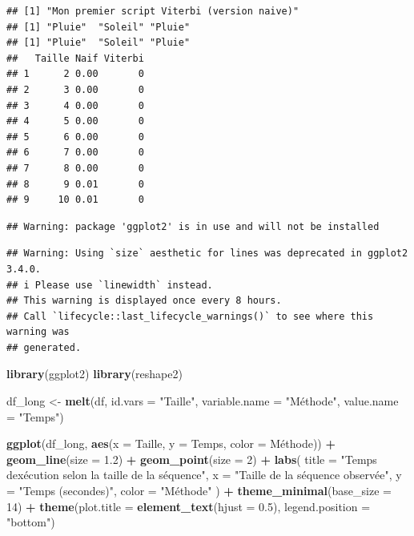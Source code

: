 \documentclass[
]{article}
\newenvironment{Shaded}{\begin{snugshade}}{\end{snugshade}}
\newcommand{\AttributeTok}[1]{\textcolor[rgb]{0.13,0.29,0.53}{#1}}
\newcommand{\DecValTok}[1]{\textcolor[rgb]{0.00,0.00,0.81}{#1}}
\newcommand{\FloatTok}[1]{\textcolor[rgb]{0.00,0.00,0.81}{#1}}
\newcommand{\FunctionTok}[1]{\textcolor[rgb]{0.13,0.29,0.53}{\textbf{#1}}}
\newcommand{\NormalTok}[1]{#1}
\newcommand{\OtherTok}[1]{\textcolor[rgb]{0.56,0.35,0.01}{#1}}
\newcommand{\SpecialCharTok}[1]{\textcolor[rgb]{0.81,0.36,0.00}{\textbf{#1}}}
\newcommand{\StringTok}[1]{\textcolor[rgb]{0.31,0.60,0.02}{#1}}
\begin{document}
\begin{verbatim}
## [1] "Mon premier script Viterbi (version naive)"
## [1] "Pluie"  "Soleil" "Pluie" 
## [1] "Pluie"  "Soleil" "Pluie" 
##   Taille Naif Viterbi
## 1      2 0.00       0
## 2      3 0.00       0
## 3      4 0.00       0
## 4      5 0.00       0
## 5      6 0.00       0
## 6      7 0.00       0
## 7      8 0.00       0
## 8      9 0.01       0
## 9     10 0.01       0
\end{verbatim}

\begin{verbatim}
## Warning: package 'ggplot2' is in use and will not be installed
\end{verbatim}

\begin{verbatim}
## Warning: Using `size` aesthetic for lines was deprecated in ggplot2 3.4.0.
## i Please use `linewidth` instead.
## This warning is displayed once every 8 hours.
## Call `lifecycle::last_lifecycle_warnings()` to see where this warning was
## generated.
\end{verbatim}

\begin{Shaded}
\begin{Highlighting}[]
\FunctionTok{library}\NormalTok{(ggplot2)}
\FunctionTok{library}\NormalTok{(reshape2)}

\NormalTok{df\_long }\OtherTok{\textless{}{-}} \FunctionTok{melt}\NormalTok{(df, }\AttributeTok{id.vars =} \StringTok{"Taille"}\NormalTok{, }\AttributeTok{variable.name =} \StringTok{"Méthode"}\NormalTok{, }\AttributeTok{value.name =} \StringTok{"Temps"}\NormalTok{)}

\FunctionTok{ggplot}\NormalTok{(df\_long, }\FunctionTok{aes}\NormalTok{(}\AttributeTok{x =}\NormalTok{ Taille, }\AttributeTok{y =}\NormalTok{ Temps, }\AttributeTok{color =}\NormalTok{ Méthode)) }\SpecialCharTok{+}
  \FunctionTok{geom\_line}\NormalTok{(}\AttributeTok{size =} \FloatTok{1.2}\NormalTok{) }\SpecialCharTok{+}
  \FunctionTok{geom\_point}\NormalTok{(}\AttributeTok{size =} \DecValTok{2}\NormalTok{) }\SpecialCharTok{+}
  \FunctionTok{labs}\NormalTok{(}
    \AttributeTok{title =} \StringTok{"Temps d\textquotesingle{}exécution selon la taille de la séquence"}\NormalTok{,}
    \AttributeTok{x =} \StringTok{"Taille de la séquence observée"}\NormalTok{,}
    \AttributeTok{y =} \StringTok{"Temps (secondes)"}\NormalTok{,}
    \AttributeTok{color =} \StringTok{"Méthode"}
\NormalTok{  ) }\SpecialCharTok{+}
  \FunctionTok{theme\_minimal}\NormalTok{(}\AttributeTok{base\_size =} \DecValTok{14}\NormalTok{) }\SpecialCharTok{+}
  \FunctionTok{theme}\NormalTok{(}\AttributeTok{plot.title =} \FunctionTok{element\_text}\NormalTok{(}\AttributeTok{hjust =} \FloatTok{0.5}\NormalTok{), }\AttributeTok{legend.position =} \StringTok{"bottom"}\NormalTok{)}
\end{Highlighting}
\end{Shaded}
\end{document}
